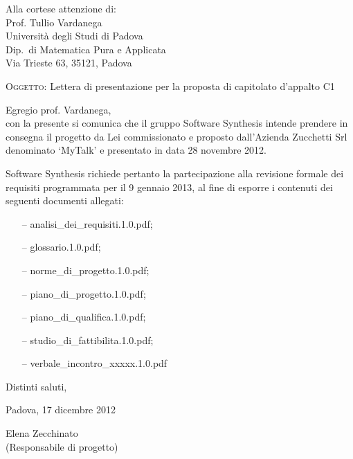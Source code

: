 \documentclass[a4paper,10pt]{letter}
\begin{document}
\begin{flushright}
\begin{minipage}[t]{.5\textwidth}
Alla cortese attenzione di:\\
Prof. Tullio Vardanega\\
Università degli Studi di Padova\\
Dip.~di Matematica Pura e Applicata\\
Via Trieste 63, 35121, Padova\\
\end{minipage}
\end{flushright}

\bigskip
\textsc{Oggetto:} Lettera di presentazione per la proposta di capitolato d’appalto C1
\bigskip

\noindent{}Egregio prof. Vardanega,\\
\hspace*{11em} con la presente si comunica che il gruppo Software Synthesis intende prendere in consegna il progetto da Lei commissionato e proposto dall'Azienda Zucchetti Srl denominato `MyTalk' e presentato in data 28 novembre 2012.

Software Synthesis richiede pertanto la partecipazione alla revisione formale dei requisiti programmata per il 9 gennaio 2013, al fine di esporre i contenuti dei seguenti documenti allegati:

\begin{itemize}
\item[--] analisi\_dei\_requisiti.1.0.pdf;
\item[--] glossario.1.0.pdf;
\item[--] norme\_di\_progetto.1.0.pdf;
\item[--] piano\_di\_progetto.1.0.pdf;
\item[--] piano\_di\_qualifica.1.0.pdf;
\item[--] studio\_di\_fattibilita.1.0.pdf;
\item[--] verbale\_incontro\_xxxxx.1.0.pdf
\end{itemize}

\bigskip

Distinti saluti,

\bigskip
Padova, 17 dicembre 2012

\bigskip

\begin{flushright}
\begin{minipage}[t]{.35\textwidth}
Elena Zecchinato\\
(Responsabile di progetto)
\end{minipage}
\end{flushright}
\end{document}
